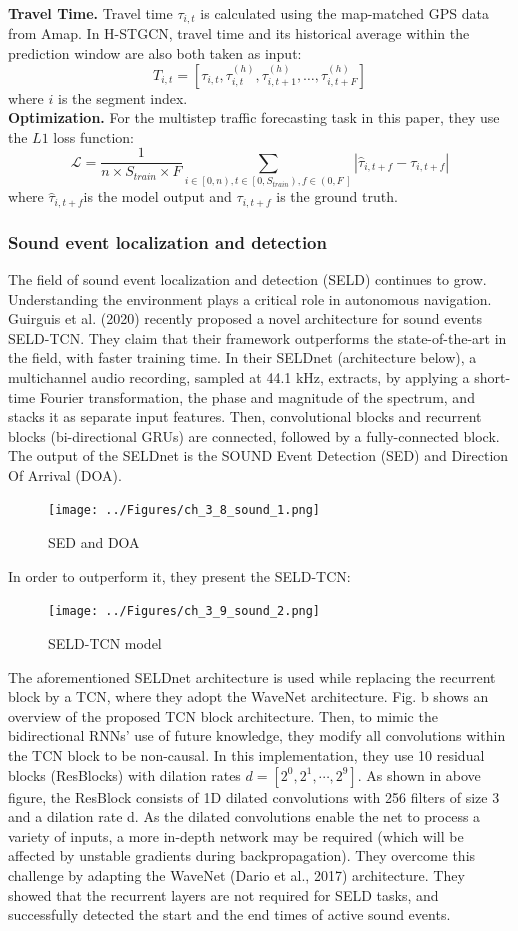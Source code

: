\textbf{Travel Time.} Travel time $\tau_{i,t}$ is calculated using the map-matched GPS data from Amap. In H-STGCN, travel time and its historical average within the prediction window are also both taken as input:
$$T_{i,t}=\left[\tau_{i,t},\tau_{i,t}^{\left(h\right)},\tau_{i,t+1}^{\left(h\right)},\ldots,\tau_{i,t+F}^{\left(h\right)}\right]$$
where $i$ is the segment index. \\
 \textbf{Optimization.} For the multistep traffic forecasting task in this paper, they use the $L1 $ loss function:
$$\mathcal{L}=\frac{1}{n\times S_{train}\times F}\sum_{i\in\left[0,n\right),t\in\left[0,S_{train}\right),f\in\left(0,F\ \right]}\left|{\hat{\tau}}_{i,t+f}-\tau_{i,t+f}\right|$$
where ${\hat{\tau}}_{i,t+f}$is the model output and $\tau_{i,t+f}$ is the ground truth.
\subsubsection{Sound event localization and detection}
The field of sound event localization and detection (SELD) continues to grow. Understanding the environment plays a critical role in autonomous navigation. Guirguis et al. (2020) recently proposed a novel architecture for sound events SELD-TCN. They claim that their framework outperforms the state-of-the-art in the field, with faster training time. In their SELDnet (architecture below), a multichannel audio recording, sampled at 44.1 kHz, extracts, by applying a short-time Fourier transformation, the phase and magnitude of the spectrum, and stacks it as separate input features. Then, convolutional blocks and recurrent blocks (bi-directional GRUs) are connected, followed by a fully-connected block. The output of the SELDnet is the SOUND Event Detection (SED) and Direction Of Arrival (DOA).
\begin{figure}[H]
    \texttt{[image: ../Figures/ch\_3\_8\_sound\_1.png]}
    \caption{SED and DOA}
\end{figure}
 In order to outperform it, they present the SELD-TCN:
\begin{figure}[H]
    \texttt{[image: ../Figures/ch\_3\_9\_sound\_2.png]}
    \caption{SELD-TCN model}
\end{figure}
The aforementioned SELDnet architecture is used while replacing the recurrent block by a TCN, where they adopt the WaveNet architecture. Fig. b shows an overview of the proposed TCN block architecture. Then, to mimic the bidirectional RNNs’ use of future
knowledge, they modify all convolutions within the TCN block to be non-causal. In this implementation, they use 10 residual blocks (ResBlocks) with dilation rates $d = \left[2^0,2^1,\cdots,2^9\right]$. As shown in above figure, the ResBlock consists of 1D dilated convolutions with 256 filters of size 3 and a dilation rate d.
As the dilated convolutions enable the net to process a variety of inputs, a more in-depth network may be required (which will be affected by unstable gradients during backpropagation). They overcome this challenge by adapting the WaveNet (Dario et al., 2017) architecture. They showed that the recurrent layers are not required for SELD tasks, and successfully detected the start and the end times of active sound events.


